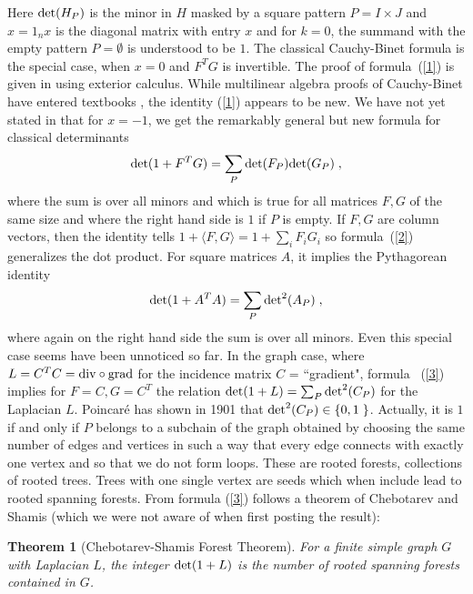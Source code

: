 \documentclass[12pt]{amsart}
\newtheorem{thm}{Theorem}
\theoremstyle{definition}
\begin{document}
Here ${{\rm det}}(H_P)$ is the minor in $H$ masked by a square pattern $P = I \times J$ and $x= 1_n x$ is
the diagonal matrix with entry $x$ and for $k=0$, the summand with the empty pattern
$P=\emptyset$ is understood to be $1$. 
The classical Cauchy-Binet formula is the special case, when $x=0$ and $F^TG$ is invertible. 
The proof of formula~(\ref{1}) is given in \cite{cauchybinet} using
exterior calculus. While multilinear algebra proofs of Cauchy-Binet have entered
textbooks \cite{HuppertWillems,Shafarevich}, the identity (\ref{1}) appears to be new.
We have not yet stated in \cite{cauchybinet} that for $x=-1$, we get the remarkably general 
but new formula for classical determinants
\begin{equation}
 {{\rm det}}(1+F^T G) = \sum_P {{\rm det}}(F_P) {{\rm det}}(G_P)  \; , 
\label{2} 
\end{equation}
where the sum is over all minors and which is true for all matrices $F,G$ of 
the same size and where the right hand side is $1$ if $P$ is empty. 
If $F,G$ are column vectors, then the identity tells $1+\langle F,G \rangle = 1+\sum_i F_i G_i$
so formula~(\ref{2}) generalizes the dot product. 
For square matrices $A$, it implies the Pythagorean identity
\begin{equation}
 {{\rm det}}(1+A^T A) = \sum_P {{\rm det}}^2(A_P)  \; ,
\label{3} 
\end{equation}
where again on the right hand side the sum is over all minors. Even this special case seems have 
been unnoticed so far. In the graph case, where $L=C^T C={\rm div} \circ {\rm grad}$ 
for the incidence matrix $C$ = ``gradient", formula ~(\ref{3})  implies 
for $F=C,G=C^T$ the relation ${{\rm det}}(1+L) = \sum_P {{\rm det}}^2(C_P)$ for the Laplacian $L$. 
Poincar\'e has shown in 1901 that ${{\rm det}}^2(C_P) \in \{0,1 \;\}$. Actually, it is $1$ if and only if $P$ 
belongs to a subchain of the graph obtained by choosing the same number of edges and vertices in such a way
that every edge connects with exactly one vertex and so that we do not form loops. These are rooted
forests, collections of rooted trees. Trees with one single vertex are seeds which when include lead to
rooted spanning forests.  From formula (\ref{3}) follows a theorem of Chebotarev and Shamis
(which we were not aware of when first posting the result):

\begin{thm}[Chebotarev-Shamis Forest Theorem]
For a finite simple graph $G$ with Laplacian $L$, the integer ${{\rm det}}(1+L)$ is the number 
of rooted spanning forests contained in $G$. 
\end{thm}
\end{document}
